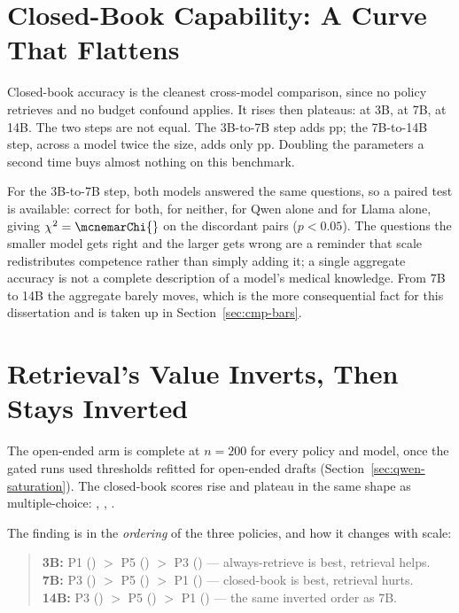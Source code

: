 \section{Closed-Book Capability: A Curve That Flattens}
\label{sec:cmp-mcq}

Closed-book accuracy is the cleanest cross-model comparison, since no policy
retrieves and no budget confound applies. It rises then plateaus:
\accPthreeMcq{} at 3B, \accQwenPthreeMcq{} at 7B, \accQwenFourteenPthreeMcq{}
at 14B. The two steps are not equal. The 3B-to-7B step adds
\scaleGainSmall{}pp; the 7B-to-14B step, across a model twice the size, adds
only \scaleGainLarge{}pp. Doubling the parameters a second time buys almost
nothing on this benchmark.

For the 3B-to-7B step, both models answered the same \mcnemarN{} questions, so
a paired test is available: \mcnemarBoth{} correct for both, \mcnemarNeither{}
for neither, \mcnemarOnlyQwen{} for Qwen alone and \mcnemarOnlyLlama{} for
Llama alone, giving $\chi^2 = \mcnemarChi{}$ on the discordant pairs
($p < 0.05$). The \mcnemarOnlyLlama{} questions the smaller model gets right
and the larger gets wrong are a reminder that scale redistributes competence
rather than simply adding it; a single aggregate accuracy is not a complete
description of a model's medical knowledge. From 7B to 14B the aggregate barely
moves, which is the more consequential fact for this dissertation and is taken
up in Section~\ref{sec:cmp-bars}.

\section{Retrieval's Value Inverts, Then Stays Inverted}
\label{sec:cmp-open}

The open-ended arm is complete at $n=200$ for every policy and model, once the
gated runs used thresholds refitted for open-ended drafts
(Section~\ref{sec:qwen-saturation}). The closed-book scores rise and plateau in
the same shape as multiple-choice: \fOnePthreeOpen{}, \fOneQwenPthreeOpen{},
\fOneQwenFourteenPthreeOpen{}.

The finding is in the \emph{ordering} of the three policies, and how it changes
with scale:

\begin{quote}
  \textbf{3B:} P1 (\fOnePoneOpen{}) $>$ P5 (\fOnePfiveOpen{}) $>$ P3
  (\fOnePthreeOpen{}) --- always-retrieve is best, retrieval helps.\\
  \textbf{7B:} P3 (\fOneQwenPthreeOpen{}) $>$ P5 (\fOneQwenPfiveOpen{}) $>$ P1
  (\fOneQwenPoneOpen{}) --- closed-book is best, retrieval hurts.\\
  \textbf{14B:} P3 (\fOneQwenFourteenPthreeOpen{}) $>$ P5
  (\fOneQwenFourteenPfiveOpen{}) $>$ P1 (\fOneQwenFourteenPoneOpen{}) ---
  the same inverted order as 7B.
\end{quote}

